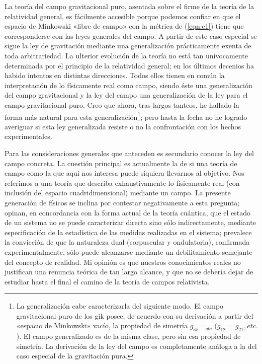 \documentclass[spanish]{book}
\begin{document}
La teoría del campo gravitacional puro, asentada
sobre el firme de la teoría de la relatividad general, es fácilmente accesible porque
podemos confiar en que el espacio de Minkowski «libre de campo» con la métrica de
(\ref{eqn:e1}) tiene que corresponderse con las leyes generales del campo. A partir de este caso
especial se sigue la ley de gravitación mediante una generalización prácticamente exenta
de toda arbitrariedad. La ulterior evolución de la teoría no está tan unívocamente
determinada por el principio de la relatividad general; en los últimos decenios ha
habido intentos en distintas direcciones. Todos ellos tienen en común la interpretación
de lo físicamente real como campo, siendo éste una generalización del campo
gravitacional y la ley del campo una generalización de la ley para el campo
gravitacional puro. Creo que ahora, tras largos tanteos, he hallado la forma más natural
para esta generalización\footnote{La generalización cabe caracterizarla del siguiente modo. El campo 
gravitacional puro de los gik posee, de acuerdo con su derivación a partir del
«espacio de Minkowski» vacío, la propiedad de simetría $g_{ik} = _{gki}(g_{12} = g_{21}, etc.$).
El campo generalizado es de la misma clase, pero sin esa propiedad de simetría. 
La derivación de la ley del campo es completamente análoga a la del caso especial de
la gravitación pura.}; pero hasta la fecha no he logrado averiguar si esta ley
generalizada resiste o no la confrontación con los hechos experimentales.

Para las consideraciones generales que anteceden es secundario conocer la ley del
campo concreta. La cuestión principal es actualmente la de si una teoría de campo
como la que aquí nos interesa puede siquiera llevarnos al objetivo. Nos referimos a
una teoría que describa exhaustivamente lo físicamente real (con inclusión del espacio
cuadridimensional) mediante un campo. La presente generación de físicos se inclina
por contestar negativamente a esta pregunta; opinan, en concordancia con la forma
actual de la teoría cuántica, que el estado de un sistema no se puede caracterizar
directa sino sólo indirectamente, mediante especificación de la estadística de las
medidas realizadas en el sistema; prevalece la convicción de que la naturaleza dual
(corpuscular y ondulatoria), confirmada experimentalmente, sólo puede alcanzarse
mediante un debilitamiento semejante del concepto de realidad. Mi opinión es que
nuestros conocimientos reales no justifican una renuncia teórica de tan largo alcance, y
que no se debería dejar de estudiar hasta el final el camino de la teoría de campos
relativista.
\end{document}
